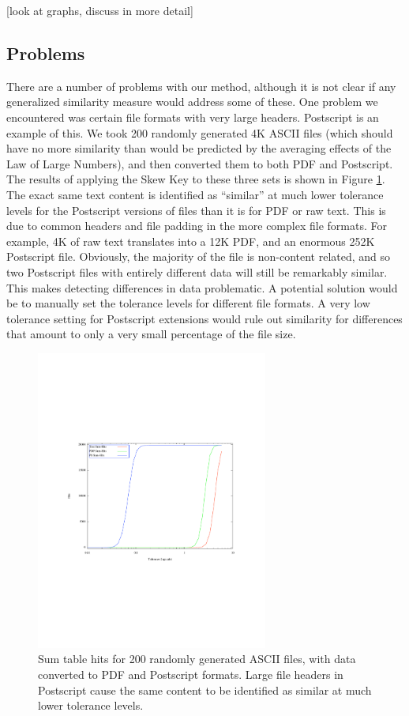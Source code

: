 \documentclass[10pt, twocolumn]{article}
\begin{document}
[look at graphs, discuss in more detail]




\subsection{Problems}

There are a number of problems with our method, although it is not clear if any  generalized similarity measure would address some of these.  One problem we encountered was certain file formats with very large headers.  Postscript is an example of this.  We took 200 randomly generated 4K ASCII files (which should have no more similarity than would be predicted by the averaging effects of the Law of Large Numbers), and then converted them to both PDF and Postscript.  The results of applying the Skew Key to these three sets is shown in Figure \ref{headerFiles}.  The exact same text content is identified as ``similar'' at much lower tolerance levels for the Postscript versions of files than it is for PDF or raw text.  This is due to common headers and file padding in the more complex file formats.  For example, 4K of raw text translates into a 12K PDF, and an enormous 252K Postscript file.  Obviously, the majority of the file is non-content related, and so two Postscript files with entirely different data will still be remarkably similar.  This makes detecting differences in data problematic.  A potential solution would be to manually set the tolerance levels for different file formats.  A very low tolerance setting for Postscript extensions would rule out similarity for differences that amount to only a very small percentage of the file size.

 \begin{figure}[t] 
 \centering
\includegraphics[width= 3in]{fileFormats.pdf}
\caption{Sum table hits for 200 randomly generated ASCII files, with data converted to PDF and Postscript formats.  Large file headers in Postscript cause the same content to be identified as similar at much lower tolerance levels.}
\label{headerFiles}
\end{figure}
\end{document}
